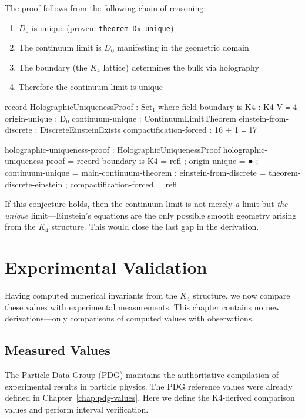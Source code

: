 \documentclass[11pt,a4paper]{book}
\begin{document}
The proof follows from the following chain of reasoning:
\begin{enumerate}
\item $D_0$ is unique (proven: \texttt{theorem-D₀-unique})
\item The continuum limit is $D_0$ manifesting in the geometric domain
\item The boundary (the $K_4$ lattice) determines the bulk via holography
\item Therefore the continuum limit is unique
\end{enumerate}

\begin{code}
record HolographicUniquenessProof : Set₁ where
  field
    boundary-is-K4 : K4-V ≡ 4
    origin-unique : D₀
    continuum-unique : ContinuumLimitTheorem
    einstein-from-discrete : DiscreteEinsteinExists
    compactification-forced : 16 + 1 ≡ 17

holographic-uniqueness-proof : HolographicUniquenessProof
holographic-uniqueness-proof = record
  { boundary-is-K4 = refl
  ; origin-unique = ●
  ; continuum-unique = main-continuum-theorem
  ; einstein-from-discrete = theorem-discrete-einstein
  ; compactification-forced = refl
  }
\end{code}

If this conjecture holds, then the continuum limit is not merely \emph{a} limit but 
\emph{the unique} limit---Einstein's equations are the only possible smooth geometry 
arising from the $K_4$ structure. This would close the last gap in the derivation.

\chapter{Experimental Validation}
\label{chap:validation}

Having computed numerical invariants from the $K_4$ structure, we now compare these values 
with experimental measurements. This chapter contains no new derivations---only 
comparisons of computed values with observations.

\section{Measured Values}

The Particle Data Group (PDG) maintains the authoritative compilation of experimental results 
in particle physics. The PDG reference values were already defined in Chapter~\ref{chap:pdg-values}.
Here we define the K4-derived comparison values and perform interval verification.
\end{document}
